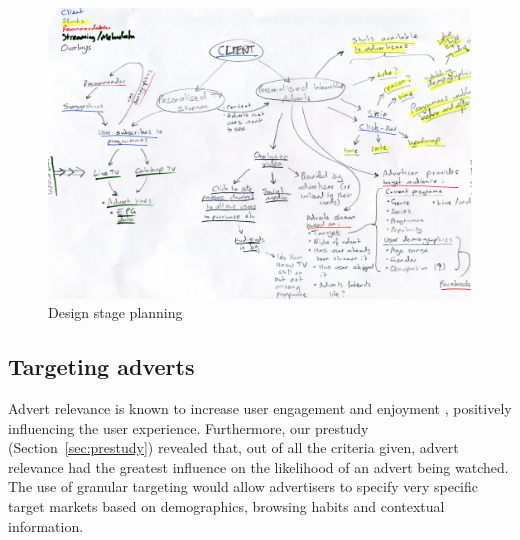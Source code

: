 	\begin{landscape}
	\begin{figure}[th]
		\centering
		\includegraphics[height=\textwidth]{images/design.jpg}
		\caption{Design stage planning}
		\label{fig:designing}
	\end{figure}
	\end{landscape}
	\newpage

\subsection{Targeting adverts}
	\label{sec:design_adverts}

	Advert relevance is known to increase user engagement \citep{nettelhorst2012effects, advertising_engagement} and enjoyment \citep{yahoo-intrusive-advertising}, positively influencing the user experience. Furthermore, our prestudy (Section~\ref{sec:prestudy}) revealed that, out of all the criteria given, advert relevance had the greatest influence on the likelihood of an advert being watched. The use of granular targeting would allow advertisers to specify very specific target markets based on demographics, browsing habits and contextual information. 

